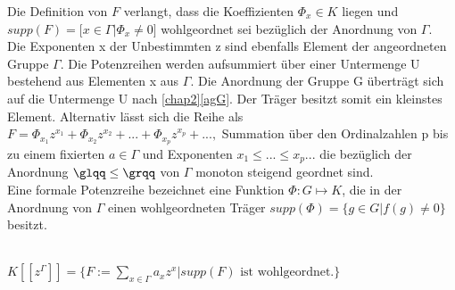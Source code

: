 Die Definition von $F$ verlangt, dass die Koeffizienten $\Phi_x \in K$ liegen und $supp(F) = \lbrack x \in \Gamma | \Phi_x \neq 0\rbrack $ wohlgeordnet sei bezüglich der Anordnung von $\Gamma$. \\
Die Exponenten x der Unbestimmten z sind ebenfalls Element der angeordneten Gruppe $\Gamma$. Die Potenzreihen werden aufsummiert über einer Untermenge U bestehend aus Elementen x aus $\Gamma$. Die Anordnung der Gruppe G überträgt sich auf die Untermenge U nach \ref{chap2}\ref{agG}. Der Träger besitzt somit ein kleinstes Element. Alternativ lässt sich die Reihe als 
$ F = \Phi_{x_1}z^{x_1} + \Phi_{x_2}z^{x_2} + ... + \Phi_{x_p}z^{x_p} + ..., $ 
Summation über den Ordinalzahlen p bis zu einem fixierten $a \in \Gamma$ und Exponenten $x_1 \le ...\le x_p ...$ die bezüglich der Anordnung $\glqq \le \grqq$ von $\Gamma$ monoton steigend geordnet sind. \cite{carruth48}\\
Eine formale Potenzreihe bezeichnet eine Funktion $\Phi: G \mapsto K$, die in der Anordnung von $\Gamma$ einen wohlgeordneten Träger $supp(\Phi) = \lbrace g \in G | f(g) \neq 0 \rbrace$ besitzt. \\\\
\vspace{0.8cm}
\centerline{$K[[z^{\Gamma}]] = \lbrace F :=  \sum_{x \in \Gamma}^{}a_x z^x | supp(F) \text{ ist wohlgeordnet.}\rbrace$} \\
%
%
